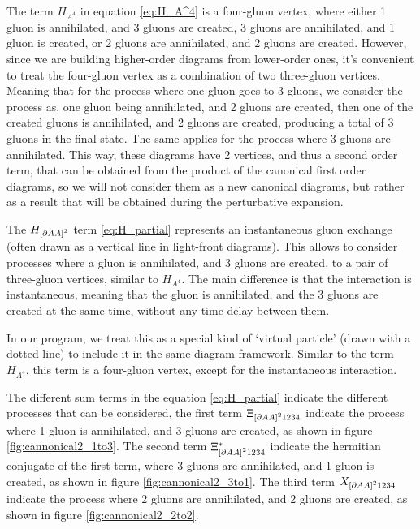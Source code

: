 \documentclass[11pt,a4paper,twoside,pdf]{article}
\numberwithin{equation}{section}
\begin{document}
The term $H_{A^4}$ in equation \eqref{eq:H_A^4} is a four-gluon vertex, where either
1 gluon is annihilated, and 3 gluons are created, 3 gluons are annihilated, and
1 gluon is created, or 2 gluons are annihilated, and 2 gluons are created. However, 
since we are building higher-order diagrams from lower-order ones, it’s convenient 
to treat the four-gluon vertex as a combination of two three-gluon vertices. Meaning that 
for the process where one gluon goes to 3 gluons, we consider the process as, 
one gluon being annihilated, and 2 gluons are created, then one of the
created gluons is annihilated, and 2 gluons are created, producing a total of 3 gluons
in the final state. The same applies for the process where 3 gluons are annihilated.
This way, these diagrams have 2 vertices, and thus a second order term, that 
can be obtained from the product of the canonical first order diagrams, so we 
will not consider them as a new canonical diagrams, but rather as a result that will
be obtained during the perturbative expansion.

The $H_{\left[ \partial A A \right]^2}$ term \eqref{eq:H_partial} represents an instantaneous gluon exchange 
(often drawn as a vertical line in light-front diagrams). This allows to consider 
processes where a gluon is annihilated, and 3 gluons are created, to a 
pair of three-gluon vertices, similar to $H_{A^4}$. The main difference is that
the interaction is instantaneous, meaning that the gluon is annihilated, and the
3 gluons are created at the same time, without any time delay between them.

In our program, we treat this as a special kind of ‘virtual particle’ (drawn with 
a dotted line) to include it in the same diagram framework. Similar to the 
term $H_{A^4}$, this term is a four-gluon vertex, except for the instantaneous 
interaction. 

The different sum terms in the equation \eqref{eq:H_partial} indicate the different 
processes that can be considered, the first term $\Xi_{\left[ \partial A A \right]^2 1234}$
indicate the process where 1 gluon is annihilated, and 3 gluons are created, as shown in
figure \ref{fig:cannonical2_1to3}. The second term $\Xi_{\left[ \partial A A \right]^2 1234}^*$
indicate the hermitian conjugate of the first term, where 3 gluons are annihilated, and
1 gluon is created, as shown in figure \ref{fig:cannonical2_3to1}. The third term
$X_{\left[ \partial A A \right]^2 1234}$ indicate the process where 2 gluons are annihilated,
and 2 gluons are created, as shown in figure \ref{fig:cannonical2_2to2}.
\end{document}
